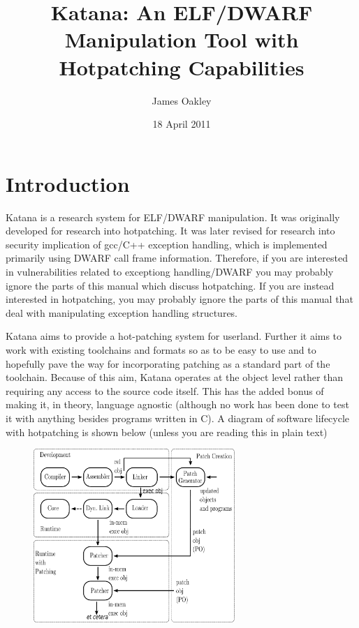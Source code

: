\documentclass[11pt]{article}
\title{Katana: An ELF/DWARF Manipulation Tool with Hotpatching Capabilities}
\author{James Oakley}
\date{18 April 2011}
\begin{document}
\maketitle

\setcounter{tocdepth}{3}
\tableofcontents
\vspace*{1cm}


\section{Introduction}
\label{sec-1}

  Katana is a research system for ELF/DWARF manipulation. It was
  originally developed for research into hotpatching. It was later
  revised for research into security implication of gcc/C++ exception
  handling, which is implemented primarily using DWARF call frame
  information. Therefore, if you are interested in vulnerabilities
  related to exceptiong handling/DWARF you may probably ignore the
  parts of this manual which discuss hotpatching. If you are instead
  interested in hotpatching, you may probably ignore the parts of this
  manual that deal with manipulating exception handling structures.
  
  Katana aims to provide a hot-patching system for userland. Further
  it aims to work with existing toolchains and formats so as to be
  easy to use and to hopefully pave the way for incorporating patching
  as a standard part of the toolchain. Because of this aim, Katana
  operates at the object level rather than requiring any access to the
  source code itself. This has the added bonus of making it, in
  theory, language agnostic (although no work has been done to test it
  with anything besides programs written in C). A diagram of software
  lifecycle with hotpatching is shown below (unless you are reading this in plain text)


\begin{figure}[h!]
\includegraphics[width=3in]{./softwarelifecycle.pdf}
\end{figure}
\end{document}
